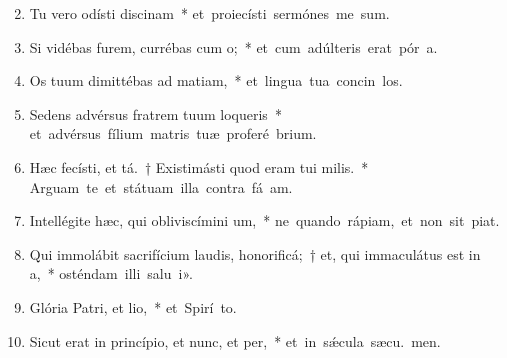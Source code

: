 \begin{flushleft}
\begin{enumerate}[leftmargin=*]
\setcounter{enumi}{1}

\item Tu vero odísti discinam~* \mbox{et proiecísti sermónes me sum.}

\item Si vidébas furem, currébas cum o;~* \mbox{et cum adúlteris erat pór a.}

\item Os tuum dimittébas ad matiam,~* \mbox{et lingua tua concin los.}

\item Sedens advérsus fratrem tuum loqueris~* \mbox{et advérsus fílium matris tuæ proferé brium.}

\item Hæc fecísti, et tá.~† Existimásti quod eram tui milis.~* \mbox{Arguam te et státuam illa contra fá am.}

\item Intellégite hæc, qui obliviscímini um,~* \mbox{ne quando rápiam, et non sit  piat.}

\item Qui immolábit sacrifícium laudis, honorificá;~† et, qui immaculátus est in a,~* \mbox{osténdam illi salu i».}

\item Glória Patri, et lio,~* \mbox{et Spirí to.}

\item Sicut erat in princípio, et nunc, et per,~* \mbox{et in s\'{\ae}cula sæcu. men.}

\end{enumerate}
\end{flushleft}

